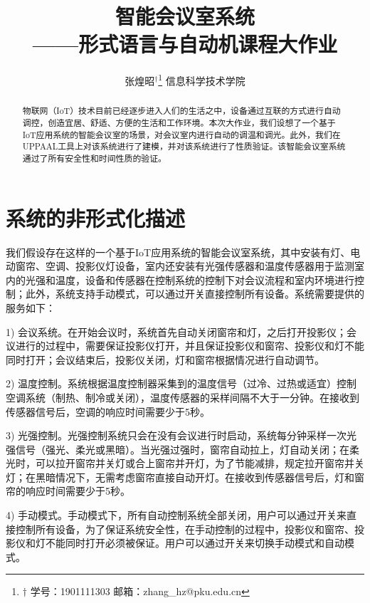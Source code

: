 \documentclass[journal, a4paper]{IEEEtran}
\begin{document}
	\title{智能会议室系统\\——形式语言与自动机课程大作业}
    \author{张煌昭$^\dagger$\thanks{$\dagger$ 学号：1901111303 邮箱：zhang\_hz@pku.edu.cn} 信息科学技术学院}
	\maketitle

\begin{abstract}
物联网（IoT）技术目前已经逐步进入人们的生活之中，设备通过互联的方式进行自动调控，创造宜居、舒适、方便的生活和工作环境。本次大作业，我们设想了一个基于IoT应用系统的智能会议室的场景，对会议室内进行自动的调温和调光。此外，我们在UPPAAL工具上对该系统进行了建模，并对该系统进行了性质验证。该智能会议室系统通过了所有安全性和时间性质的验证。
\end{abstract}


\section{系统的非形式化描述}
\label{section:informal}

我们假设存在这样的一个基于IoT应用系统的智能会议室系统，其中安装有灯、电动窗帘、空调、投影仪灯设备，室内还安装有光强传感器和温度传感器用于监测室内的光强和温度，设备和传感器在控制系统的控制下对会议流程和室内环境进行控制；此外，系统支持手动模式，可以通过开关直接控制所有设备。系统需要提供的服务如下：

1) 会议系统。在开始会议时，系统首先自动关闭窗帘和灯，之后打开投影仪；会议进行的过程中，需要保证投影仪打开，并且保证投影仪和窗帘、投影仪和灯不能同时打开；会议结束后，投影仪关闭，灯和窗帘根据情况进行自动调节。

2) 温度控制。系统根据温度控制器采集到的温度信号（过冷、过热或适宜）控制空调系统（制热、制冷或关闭），温度传感器的采样间隔不大于一分钟。在接收到传感器信号后，空调的响应时间需要少于5秒。

3) 光强控制。光强控制系统只会在没有会议进行时启动，系统每分钟采样一次光强信号（强光、柔光或黑暗）。当光强过强时，窗帘自动拉上，灯自动关闭；在柔光时，可以拉开窗帘并关灯或合上窗帘并开灯，为了节能减排，规定拉开窗帘并关灯；在黑暗情况下，无需考虑窗帘直接自动开灯。在接收到传感器信号后，灯和窗帘的响应时间需要少于5秒。

4) 手动模式。手动模式下，所有自动控制系统全部关闭，用户可以通过开关来直接控制所有设备，为了保证系统安全性，在手动控制的过程中，投影仪和窗帘、投影仪和灯不能同时打开必须被保证。用户可以通过开关来切换手动模式和自动模式。
\end{document}
